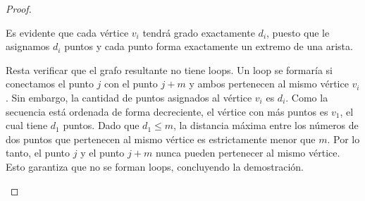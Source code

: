 \begin{proof}
\begin{itemize}
		      Es evidente que cada vértice \( v_i \) tendrá grado exactamente \( d_i \), puesto que le asignamos \( d_i \) puntos y cada punto forma exactamente un extremo de una arista.

		      Resta verificar que el grafo resultante no tiene loops. Un loop se formaría si conectamos el punto \( j \) con el punto \( j+m \) y ambos pertenecen al mismo vértice \( v_i \). Sin embargo, la cantidad de puntos asignados al vértice \( v_i \) es \( d_i \). Como la secuencia está ordenada de forma decreciente, el vértice con más puntos es \( v_1 \), el cual tiene \( d_1 \) puntos.
		      Dado que \( d_1 \le m \), la distancia máxima entre los números de dos puntos que pertenecen al mismo vértice es estrictamente menor que \( m \).
		      Por lo tanto, el punto \( j \) y el punto \( j+m \) nunca pueden pertenecer al mismo vértice. Esto garantiza que no se forman loops, concluyendo la demostración.
	\end{itemize}
\end{proof}

\vspace{0.5cm}

